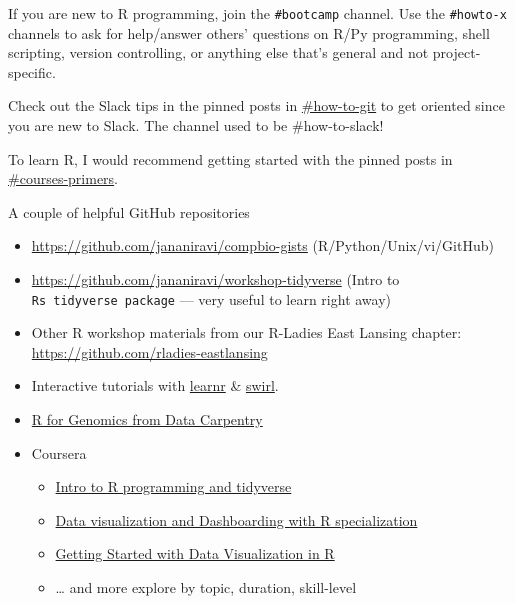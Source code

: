 \documentclass[
  letterpaper,
  DIV=11,
  numbers=noendperiod]{scrreprt}
\providecommand{\tightlist}{%
  \setlength{\itemsep}{0pt}\setlength{\parskip}{0pt}}\usepackage{longtable,booktabs,array}
\begin{document}
If you are new to R programming, join the \texttt{\#bootcamp} channel.
Use the \texttt{\#howto-x} channels to ask for help/answer others'
questions on R/Py programming, shell scripting, version controlling, or
anything else that's general and not project-specific.

Check out the Slack tips in the pinned posts in
\href{https://jravilab.slack.com/archives/CATMCKFT9}{\#how-to-git} to
get oriented since you are new to Slack. The channel used to be
\#how-to-slack!

To learn R, I would recommend getting started with the pinned posts in
\href{https://jravilab.slack.com/archives/CARJ72W3U}{\#courses-primers}.

A couple of helpful GitHub repositories

\begin{itemize}
\item
  \url{https://github.com/jananiravi/compbio-gists}
  (R/Python/Unix/vi/GitHub)
\item
  \url{https://github.com/jananiravi/workshop-tidyverse} (Intro to
  \texttt{R\textquotesingle{}s\ tidyverse\ package} --- very useful to
  learn right away)
\item
  Other R workshop materials from our R-Ladies East Lansing chapter:
  \url{https://github.com/rladies-eastlansing}
\item
  Interactive tutorials with
  \href{https://rstudio.github.io/learnr/}{learnr} \&
  \href{https://swirlstats.com/}{swirl}.
\item
  \href{https://datacarpentry.org/R-genomics/index.html}{R for Genomics
  from Data Carpentry}
\item
  Coursera

  \begin{itemize}
  \tightlist
  \item
    \href{https://www.coursera.org/learn/r-programming-tidyverse}{Intro
    to R programming and tidyverse}
  \item
    \href{https://www.coursera.org/specializations/jhu-data-visualization-dashboarding-with-r}{Data
    visualization and Dashboarding with R specialization}
  \item
    \href{https://www.coursera.org/learn/jhu-getting-started-data-viz-r}{Getting
    Started with Data Visualization in R}
  \item
    \ldots{} and more \textbar{} explore by topic, duration, skill-level
  \end{itemize}
\end{itemize}
\end{document}
